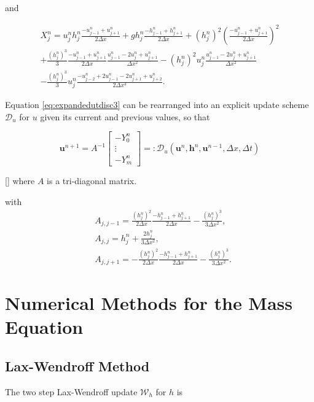 and

\begin{multline*}
X_j^n = u_j^nh_j^n\frac{-u^{n}_{j-1} + u^{n}_{j+1} }{2 \Delta x} + gh^n_j\frac{-h^{n}_{j-1} + h^{n}_{j+1} }{2 \Delta x} + \left(h^n_j\right)^2\left(\frac{-u^{n}_{j-1} + u^{n}_{j+1} }{2 \Delta x} \right)^2  \\ + \frac{\left(h^n_j\right)^3}{3}\frac{-u^{n}_{j-1} + u^{n}_{j+1} }{2 \Delta x}\frac{u^{n}_{j-1} - 2u^{n}_{j} + u^{n}_{j+1} }{\Delta x^2} - \left(h^n_j\right)^2u_j^n\frac{u^{n}_{j-1} - 2u^{n}_{j} + u^{n}_{j+1} }{\Delta x^2} \\- \frac{\left(h^n_j\right)^3}{3}u^n_j \frac{- u^{n}_{j-2} + 2u^{n}_{j-1} - 2u^{n}_{j+1} + u^{n}_{j+2}}{2\Delta x^3}.
\end{multline*}

Equation \eqref{eq:expandedutdisc3} can be rearranged into an explicit update scheme $\mathcal{D}_u$ for $u$ given its current and previous values, so that

\begin{equation}
\boldsymbol{u}^{n+ 1}
= A^{-1} \left[\begin{array}{c}
-Y^n_0 \\
\vdots \\
-Y^n_m \end{array}\right] =: \mathcal{D}_u\left(\boldsymbol{u}^n,\boldsymbol{h}^n, \boldsymbol{u}^{n-1}, \Delta x, \Delta t \right)
\label{eq:FDcentforu}
\end{equation}

[]
where $A$ is a tri-diagonal matrix.

with
\begin{align}
	&A_{j,j-1} = \frac{\left(h^n_j\right)^2}{2\Delta x}\frac{- h^n_{j-1}+ h^n_{j+1}}{2\Delta x} - \frac{\left(h^n_j\right)^3}{3 \Delta x^2}  ,\\
	&A_{j,j} = h^n_j + \frac{2 h^n_j}{3 \Delta x^2}, \\
	&A_{j,j+1} = -\frac{\left(h^n_j\right)^2}{2\Delta x}\frac{- h^n_{j-1} + h^n_{j+1}}{2\Delta x} - \frac{\left(h^n_j\right)^3}{3 \Delta x^2}.
\end{align}


\section{Numerical Methods for the Mass Equation}

\subsection{Lax-Wendroff Method}
The two step Lax-Wendroff update $\mathcal{W}_h$ for $h$ is

